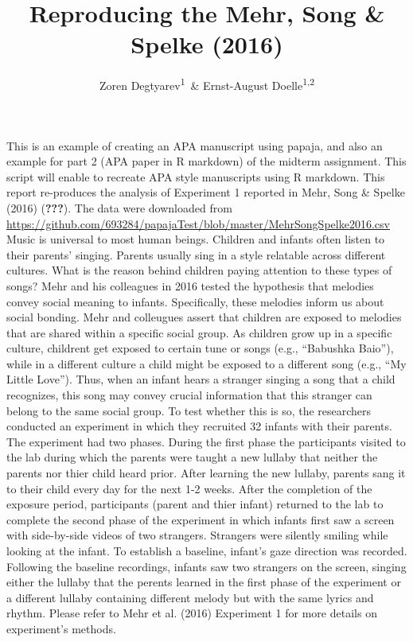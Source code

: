 \documentclass[man]{apa6}
\title{Reproducing the Mehr, Song \& Spelke (2016)}
\author{Zoren Degtyarev\textsuperscript{1}~\& Ernst-August
Doelle\textsuperscript{1,2}}
\date{}
\affiliation{
\vspace{0.5cm}
\textsuperscript{1} Brooklyn College of the City University of New York\\\textsuperscript{2} Konstanz Business School}
\begin{document}
\maketitle

This is an example of creating an APA manuscript using papaja, and also
an example for part 2 (APA paper in R markdown) of the midterm
assignment. This script will enable to recreate APA style manuscripts
using R markdown. This report re-produces the analysis of Experiment 1
reported in Mehr, Song \& Spelke (2016) ({\textbf{???}}). The data were
downloaded from
\url{https://github.com/693284/papajaTest/blob/master/MehrSongSpelke2016.csv}
Music is universal to most human beings. Children and infants often
listen to their parents' singing. Parents usually sing in a style
relatable across different cultures. What is the reason behind children
paying attention to these types of songs? Mehr and his colleagues in
2016 tested the hypothesis that melodies convey social meaning to
infants. Specifically, these melodies inform us about social bonding.
Mehr and colleugues assert that children are exposed to melodies that
are shared within a specific social group. As children grow up in a
specific culture, childrent get exposed to certain tune or songs (e.g.,
\enquote{Babushka Baio}), while in a different culture a child might be
exposed to a different song (e.g., \enquote{My Little Love}). Thus, when
an infant hears a stranger singing a song that a child recognizes, this
song may convey crucial information that this stranger can belong to the
same social group. To test whether this is so, the researchers conducted
an experiment in which they recruited 32 infants with their parents. The
experiment had two phases. During the first phase the participants
visited to the lab during which the parents were taught a new lullaby
that neither the parents nor thier child heard prior. After learning the
new lullaby, parents sang it to their child every day for the next 1-2
weeks. After the completion of the exposure period, participants (parent
and thier infant) returned to the lab to complete the second phase of
the experiment in which infants first saw a screen with side-by-side
videos of two strangers. Strangers were silently smiling while looking
at the infant. To establish a baseline, infant's gaze direction was
recorded. Following the baseline recordings, infants saw two strangers
on the screen, singing either the lullaby that the perents learned in
the first phase of the experiment or a different lullaby containing
different melody but with the same lyrics and rhythm. Please refer to
Mehr et al. (2016) Experiment 1 for more details on experiment's
methods.
\end{document}
